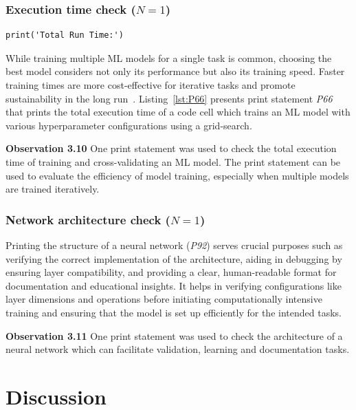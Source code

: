 \documentclass[journal]{IEEEtran}       %
\newcommand{\highlight}[1]{
  \begin{framed}%
    \noindent#1
\end{framed}}
\begin{document}
\subsubsection{Execution time check ($N = 1$)}
\begin{lstlisting}[caption={Print statement \emph{P66} used to check the total execution time of training an ML model with various hyper-parameter configurations.}, label={lst:P66}]
print('Total Run Time:')
\end{lstlisting}

While training multiple ML models for a single task is common,
choosing the best model considers not only its performance but also
its training speed. Faster training times are more cost-effective for
iterative tasks and promote sustainability in the long
run~\cite{shome2022data}. Listing~\ref{lst:P66} presents print
statement \emph{P66} that prints the total execution time of a code
cell which trains an ML model with various hyperparameter
configurations using a grid-search.

\highlight{\textbf{Observation 3.10} One print statement was used to
  check the total execution time of training and cross-validating an ML
  model. The print statement can be used to evaluate the efficiency of
model training, especially when multiple models are trained iteratively.}

\subsubsection{Network architecture check ($N = 1$)}

Printing the structure of a neural network (\emph{P92}) serves
crucial purposes such as verifying the correct implementation of the
architecture, aiding in debugging by ensuring layer compatibility,
and providing a clear, human-readable format for documentation and
educational insights. It helps in verifying configurations like layer
dimensions and operations before initiating computationally intensive
training and ensuring that the model is set up efficiently for the
intended tasks.

\highlight{\textbf{Observation 3.11} One print statement was used to
  check the architecture of a neural network which can facilitate
validation, learning and documentation tasks.}

\section{Discussion}\label{sec:discuss}
\end{document}
